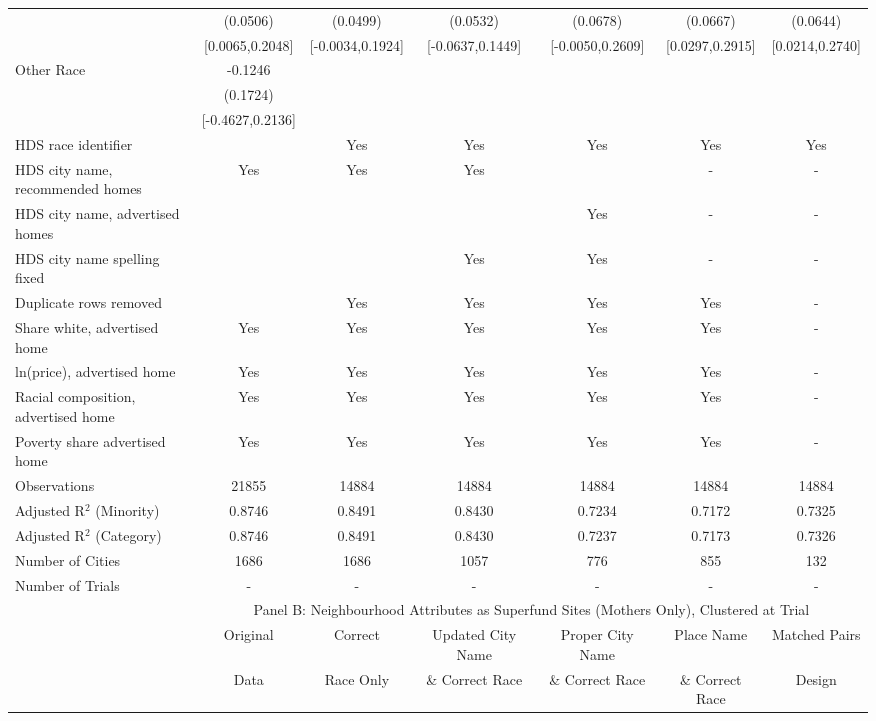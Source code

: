 \begin{table}[htbp]
{\begin{tabular}{l*{6}{c}}
 & (0.0506) & (0.0499) & (0.0532) & (0.0678) & (0.0667) & (0.0644) \\
 & [0.0065,0.2048] & [-0.0034,0.1924] & [-0.0637,0.1449] & [-0.0050,0.2609] & [0.0297,0.2915] & [0.0214,0.2740] \\
Other Race & -0.1246 &  &  &  &  &  \\
 & (0.1724) &  &  &  &  &  \\
 & [-0.4627,0.2136] &  &  &  &  &  \\
\midrule
HDS race identifier & & Yes & Yes & Yes & Yes & Yes \\
HDS city name, recommended homes & Yes & Yes & Yes & & - & -\\
HDS city name, advertised homes &  &  &  & Yes & - & -\\
HDS city name spelling fixed & & & Yes & Yes & - & -\\
Duplicate rows removed &  & Yes & Yes & Yes & Yes & - \\
\midrule
Share white, advertised home  & Yes & Yes & Yes & Yes & Yes & - \\
ln(price), advertised home  & Yes & Yes & Yes & Yes & Yes & - \\
Racial composition, advertised home & Yes & Yes & Yes & Yes & Yes & - \\
Poverty share advertised home & Yes & Yes & Yes & Yes & Yes & - \\
Observations & 21855 & 14884 & 14884 & 14884 & 14884 & 14884 \\
Adjusted R$^2$ (Minority) & 0.8746 & 0.8491 & 0.8430 & 0.7234 & 0.7172 & 0.7325 \\
Adjusted R$^2$ (Category) & 0.8746 & 0.8491 & 0.8430 & 0.7237 & 0.7173 & 0.7326 \\
Number of Cities & 1686 & 1686 & 1057 & 776 & 855 & 132 \\
Number of Trials & - & - & - & - & - & - \\
\bottomrule
\toprule
& \multicolumn{6}{c}{Panel B: Neighbourhood Attributes as Superfund Sites (Mothers Only), Clustered at Trial}\\
\toprule
                    &\multicolumn{1}{c}{Original}&\multicolumn{1}{c}{Correct}&\multicolumn{1}{c}{Updated City Name}&\multicolumn{1}{c}{Proper City Name}&\multicolumn{1}{c}{Place Name}&\multicolumn{1}{c}{Matched Pairs}\\
                      &\multicolumn{1}{c}{Data}&\multicolumn{1}{c}{Race Only}&\multicolumn{1}{c}{\& Correct Race}&\multicolumn{1}{c}{\& Correct Race}&\multicolumn{1}{c}{\& Correct Race}&\multicolumn{1}{c}{Design}\\                  

\end{tabular}}
\end{table}
